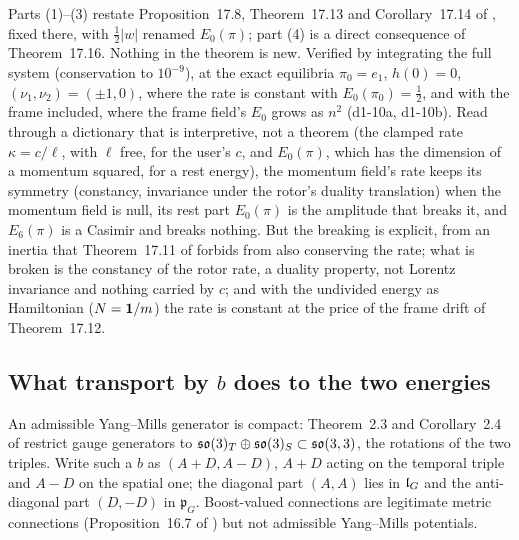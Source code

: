 Parts (1)--(3) restate Proposition~17.8, Theorem~17.13 and Corollary~17.14 of \cite{ES17}, fixed there, with $\tfrac12|w|$ renamed $E_0(\pi)$; part (4)
is a direct consequence of Theorem~17.16. Nothing in the theorem is new. Verified by integrating the full system (conservation to $10^{-9}$), at
the exact equilibria $\pi_0=e_1$, $h(0)=0$, $(\nu_1,\nu_2)=(\pm1,0)$, where the rate is constant with $E_0(\pi_0)=\tfrac12$, and with the frame
included, where the frame field's $E_0$ grows as $n^2$ (d1-10a, d1-10b). Read through a dictionary that is interpretive, not a theorem (the
clamped rate $\kappa=c/\ell$, with $\ell$ free, for the user's $c$, and $E_0(\pi)$, which has the dimension of a momentum squared, for a rest energy), the momentum field's rate keeps its symmetry
(constancy, invariance under the rotor's duality translation) when the momentum field is null, its rest part $E_0(\pi)$ is the amplitude that breaks
it, and $E_6(\pi)$ is a Casimir and breaks nothing. But the breaking is explicit, from an inertia that Theorem~17.11 of \cite{ES17} forbids from also
conserving the rate; what is broken is the constancy of the rotor rate, a duality property, not Lorentz invariance and nothing carried by $c$; and with
the undivided energy as Hamiltonian ($N=\mathbf 1/m$) the rate is constant at the price of the frame drift of Theorem~17.12.

\subsection{\texorpdfstring{What transport by $b$ does to the two energies}{What transport by b does to the two energies}}
\label{d1:sec:b}

An admissible Yang--Mills generator is compact: Theorem~2.3 and Corollary~2.4 of \cite{ES17} restrict gauge generators to
$\mathfrak{so}(3)_T\oplus\mathfrak{so}(3)_S\subset\mathfrak{so}(3,3)$, the rotations of the two triples. Write such a $b$ as $(A+D,A-D)$, $A+D$ acting on the temporal triple and $A-D$ on the
spatial one; the diagonal part $(A,A)$ lies in $\mathfrak l_G$ and the anti-diagonal part $(D,-D)$ in $\mathfrak p_G$. Boost-valued connections are legitimate
metric connections (Proposition~16.7 of \cite{ES17}) but not admissible Yang--Mills potentials.

